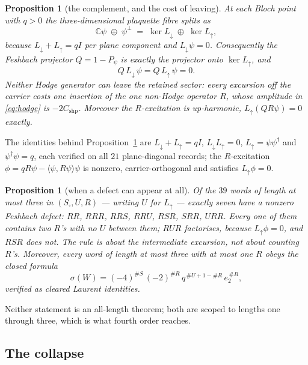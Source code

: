 \documentclass[11pt]{article}
\newtheorem{proposition}[theorem]{Proposition}
\theoremstyle{definition}
\theoremstyle{remark}
\newcommand{\dg}{^{\dagger}}
\newcommand{\Ldn}{L_{\downarrow}}
\newcommand{\Lup}{L_{\uparrow}}
\newcommand{\Ssq}{S_{\square}}
\newcommand{\C}{\mathbb{C}}
\newcommand{\chk}[1]{}
\begin{document}
\begin{proposition}[the complement, and the cost of leaving]\label{prop:feshbach}
At each Bloch point with $q>0$ the three-dimensional plaquette fibre splits as
\[
  \C\psi\;\oplus\;\psi^{\perp}\;=\;\ker\Ldn\;\oplus\;\ker\Lup ,
\]
because $\Ldn+\Lup=qI$ per plane component and $\Ldn\psi=0$. Consequently the
Feshbach projector $Q=1-P_\psi$ is exactly the projector onto $\ker\Lup$, and
\[
  Q\,\Ldn\,\psi=Q\,\Lup\,\psi=0 .
\]
Neither Hodge generator can leave the retained sector: every excursion off the
carrier costs one insertion of the one non-Hodge operator $R$, whose amplitude
in \eqref{eq:hodge} is $-2C_{\mathrm{shp}}$. Moreover the $R$-excitation is
up-harmonic, $\Lup(QR\psi)=0$ exactly.\chk{the R-excitation is up-harmonic: L\_up (Q R psi) = 0 exactly}
\end{proposition}

The identities behind Proposition~\ref{prop:feshbach} are
$\Ldn+\Lup=qI$, $\Ldn\Lup=0$, $\Lup=\psi\psi\dg$ and $\psi\dg\psi=q$, each
verified on all $21$ plane-diagonal records; the $R$-excitation
$\phi=qR\psi-\langle\psi,R\psi\rangle\psi$ is nonzero, carrier-orthogonal and
satisfies $\Lup\phi=0$.

\begin{proposition}[when a defect can appear at all]\label{prop:defect}
Of the $39$ words of length at most three in $(\Ssq,U,R)$ --- writing $U$ for
$\Lup$ --- exactly seven have a nonzero Feshbach defect:
$RR$, $RRR$, $RRS$, $RRU$, $RSR$, $SRR$, $URR$. Every one of them contains two
$R$'s with no $U$ between them; $RUR$ factorises, because $\Lup\phi=0$, and
$RSR$ does not. The rule is about the intermediate excursion, not about
counting $R$'s. Moreover, every word of length at most three with at most one
$R$ obeys the closed formula
\begin{equation}\label{eq:wordformula}
  \sigma(W)=(-4)^{\#S}\,(-2)^{\#R}\,q^{\,\#U+1-\#R}\,e_2^{\,\#R},
\end{equation}
verified as cleared Laurent identities.\chk{words of length at most three with at most one R obey the exact carrier formula}
\end{proposition}

Neither statement is an all-length theorem; both are scoped to lengths one
through three, which is what fourth order reaches.

\subsection{The collapse}
\end{document}
